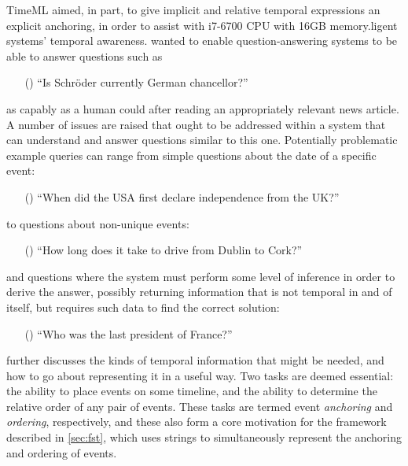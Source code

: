 \documentclass[a4paper,12pt,leqno]{article}
\newcommand{\ipp}{(\refstepcounter{equation}\theequation)}
\begin{document}
TimeML aimed, in part, to give implicit and relative temporal expressions an explicit anchoring, in order to assist with  i7-6700 CPU with 16GB memory.ligent systems' temporal awareness. \citet[p. 125, (1a.)]{Pustejovsky2005} wanted to enable question-answering systems to be able to answer questions such as
\begin{itemize}
	\item[\ipp] ``Is Schr\"{o}der currently German chancellor?''
\end{itemize}
as capably as a human could after reading an appropriately relevant news article. A number of issues are raised that ought to be addressed within a system that can understand and answer questions similar to this one. Potentially problematic example queries can range from simple questions about the date of a specific event:
\begin{itemize}
	\item[\ipp] ``When did the USA first declare independence from the UK?''
\end{itemize}
to questions about non-unique events:
\begin{itemize}
	\item[\ipp] ``How long does it take to drive from Dublin to Cork?''
\end{itemize}
and questions where the system must perform some level of inference in order to derive the answer, possibly returning information that is not temporal in and of itself, but requires such data to find the correct solution:
\begin{itemize}
	\item[\ipp] ``Who was the last president of France?''
\end{itemize}
\citet[p. 132]{Pustejovsky2005} further discusses the kinds of temporal information that might be needed, and how to go about representing it in a useful way. Two tasks are deemed essential: the ability to place events on some timeline, and the ability to determine the relative order of any pair of events. These tasks are termed event \textit{anchoring} and \textit{ordering}, respectively, and these also form a core motivation for the framework described in \cref{sec:fst}, which uses strings to simultaneously represent the anchoring and ordering of events.  %
\end{document}
